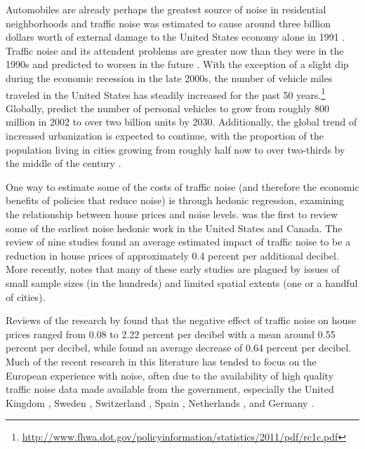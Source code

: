 \documentclass{article}\usepackage{graphicx, color}
\begin{document}
Automobiles are already perhaps the greatest source of noise in residential neighborhoods \citep{Barber2010} and traffic noise was estimated to cause around three billion dollars worth of external damage to the United States economy alone in 1991 \citep{Delucchi1998}. Traffic noise and its attendent problems are greater now than they were in the 1990s and predicted to worsen in the future \citep{Goines2007}.  With the exception of a slight dip during the economic recession in the late 2000s, the number of vehicle miles traveled in the United States has steadily increased for the past 50 years.\footnote{\url{http://www.fhwa.dot.gov/policyinformation/statistics/2011/pdf/rc1c.pdf}} Globally, \citet{Dargay2007} predict the number of personal vehicles to grow from roughly 800 million in 2002 to over two billion units by 2030. Additionally, the global trend of increased urbanization is expected to continue, with the proportion of the population living in cities growing from roughly half now to over two-thirds by the middle of the century . 

One way to estimate some of the costs of traffic noise (and therefore the economic benefits of policies that reduce noise) is through hedonic regression, examining the relationship between house prices and noise levels. \citet{Nelson1982} was the first to review some of the earliest noise hedonic work in the United States and Canada. The review of nine studies found an average estimated impact of traffic noise to be a reduction in house prices of approximately 0.4 percent per additional decibel. More recently, \citet{Nelson2008} notes that many of these early studies \citep[such as][]{Gamble1974, Langley1976} are plagued by issues of small sample sizes (in the hundreds) and limited spatial extents (one or a handful of cities). 

Reviews of the research by \citet{Bateman2001} found that the negative effect of traffic noise on house prices ranged from 0.08 to 2.22 percent per decibel with a mean around 0.55 percent per decibel, while \citet{Navrud2002} found an average decrease of 0.64 percent per decibel. Much of the recent research in this literature has tended to focus on the European experience with noise, often due to the availability of high quality traffic noise data made available from the government, especially the United Kingdom \citep{Day2007, Blanco2011}, Sweden \citep{Wilhelmsson2000, Andersson2010}, Switzerland \citep{Baranzini2010}, Spain \citep{MarmolejoDuarteCarlos;GonzalezTamez2009}, Netherlands \citep{Theebe2004a}, and Germany \citep{Brandt2011}. 
\end{document}
